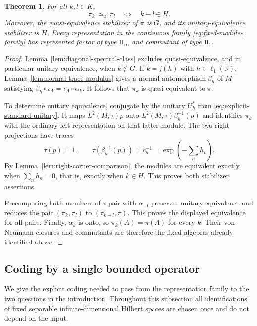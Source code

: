 \documentclass[11pt]{article}
\numberwithin{equation}{section}
\newtheorem{theorem}{Theorem}[section]
\theoremstyle{definition}
\newcommand{\R}{\mathbb R}
\newcommand{\UE}{\mathrel{\simeq_u}}
\begin{document}
\begin{theorem}
\label{thm:representation}
For all $k,l\in K$,
\[
 \pi_k\,\UE\,\pi_l\quad\Longleftrightarrow\quad k-l\in H.
\]
Moreover, the quasi-equivalence stabilizer of $\pi$ is $G$, and its
unitary-equivalence stabilizer is $H$. Every representation in the
continuous family \eqref{eq:fixed-module-family} has represented factor
of type $\mathrm{II}_\infty$ and commutant of type $\mathrm{II}_1$.
\end{theorem}

\begin{proof}
Lemma~\ref{lem:diagonal-spectral-class} excludes quasi-equivalence,
and in particular unitary equivalence, when $k\notin G$. If $k=j(h)$
with $h\in\ell_1(\R)$, Lemma~\ref{lem:normal-trace-modulus} gives a
normal automorphism $\beta_h$ of $M$ satisfying
$\beta_h\circ\iota_A=\iota_A\circ\alpha_k$. It follows that
$\pi_k$ is quasi-equivalent to $\pi$.

To determine unitary equivalence, conjugate by the unitary $U_h^*$
from \eqref{eq:explicit-standard-unitary}. It maps
$L^2(M,\tau)p$ onto $L^2(M,\tau)\beta_h^{-1}(p)$ and identifies
$\pi_k$ with the ordinary left representation on that latter module.
The two right projections have traces
\[
 \tau(p)=1,\qquad
 \tau(\beta_h^{-1}(p))=c_h^{-1}
       =\exp\!\left(-\sum_n h_n\right).
\]
By Lemma~\ref{lem:right-corner-comparison}, the modules are equivalent
exactly when $\sum_n h_n=0$, that is, exactly when $k\in H$.
This proves both stabilizer assertions.

Precomposing both members of a pair with $\alpha_{-l}$ preserves
unitary equivalence and reduces the pair $(\pi_k,\pi_l)$ to
$(\pi_{k-l},\pi)$. This proves the displayed equivalence for all pairs.
Finally, $\alpha_k$ is onto, so $\pi_k(A)=\pi(A)$ for every $k$.
Their von Neumann closures and commutants are therefore the fixed
algebras already identified above.
\end{proof}
\subsection{Coding by a single bounded operator}\label{sec:coding}
We give the explicit coding needed to pass from the representation family
to the two questions in the introduction. Throughout this subsection all
identifications of fixed separable infinite-dimensional Hilbert spaces
are chosen once and do not depend on the input.
\end{document}

